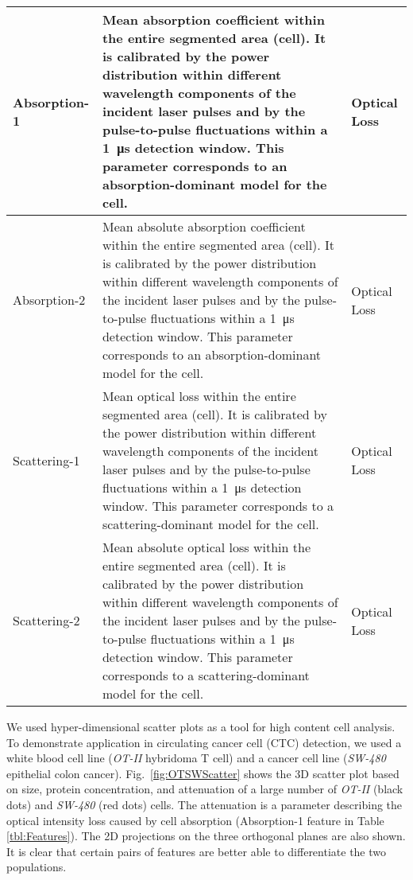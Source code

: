 \documentclass[aps,pra,reprint,longbibliography,superscriptaddress]{revtex4-1}
\begin{document}
\begin{table*}[hb!]
\begin{tabular}{|p{}|p{}|p{}|}
Absorption-1	 &Mean absorption coefficient within the entire segmented area (cell). It is calibrated by the power distribution within different wavelength components of the incident laser pulses and by the pulse-to-pulse fluctuations within a \SI{1}{\micro\second} detection window. This parameter corresponds to an absorption-dominant model for the cell.	 &Optical Loss\\ \hline
Absorption-2	 &Mean absolute absorption coefficient within the entire segmented area (cell). It is calibrated by the power distribution within different wavelength components of the incident laser pulses and by the pulse-to-pulse fluctuations within a \SI{1}{\micro\second} detection window. This parameter corresponds to an absorption-dominant model for the cell.	 &Optical Loss\\ \hline
Scattering-1	 &Mean optical loss within the entire segmented area (cell). It is calibrated by the power distribution within different wavelength components of the incident laser pulses and by the pulse-to-pulse fluctuations within a \SI{1}{\micro\second} detection window. This parameter corresponds to a scattering-dominant model for the cell.	 &Optical Loss\\ \hline
Scattering-2	 &Mean absolute optical loss within the entire segmented area (cell). It is calibrated by the power distribution within different wavelength components of the incident laser pulses and by the pulse-to-pulse fluctuations within a \SI{1}{\micro\second} detection window. This parameter corresponds to a scattering-dominant model for the cell.	 &Optical Loss\\
\hline
\end{tabular}
\end{table*}

We used hyper-dimensional scatter plots as a tool for high content cell analysis. To demonstrate application in circulating cancer cell (CTC) detection, we used a white blood cell line (\textit{OT-II} hybridoma T cell) and a cancer cell line (\textit{SW-480} epithelial colon cancer). Fig.~\ref{fig:OTSWScatter} shows the 3D scatter plot based on size, protein concentration, and attenuation of a large number of \textit{OT-II} (black dots) and \textit{SW-480} (red dots) cells. The attenuation is a parameter describing the optical intensity loss caused by cell absorption (Absorption-1 feature in Table \ref{tbl:Features}). The 2D projections on the three orthogonal planes are also shown. It is clear that certain pairs of features are better able to differentiate the two populations.
\end{document}
